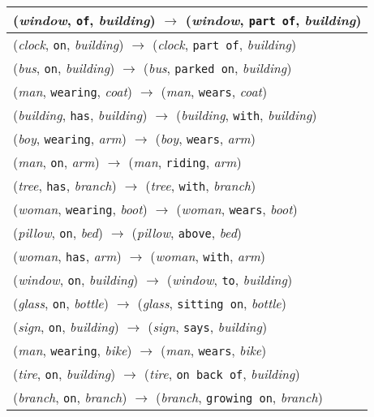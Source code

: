 \documentclass[runningheads]{llncs}
\begin{document}
{\begin{longtable}{ l }
(\textit{window}, \texttt{of}, \textit{building}) $\rightarrow$ (\textit{window}, \texttt{part of}, \textit{building}) \\ \hline
(\textit{clock}, \texttt{on}, \textit{building}) $\rightarrow$ (\textit{clock}, \texttt{part of}, \textit{building}) \\ \hline
(\textit{bus}, \texttt{on}, \textit{building}) $\rightarrow$ (\textit{bus}, \texttt{parked on}, \textit{building}) \\ \hline
(\textit{man}, \texttt{wearing}, \textit{coat}) $\rightarrow$ (\textit{man}, \texttt{wears}, \textit{coat}) \\ \hline
(\textit{building}, \texttt{has}, \textit{building}) $\rightarrow$ (\textit{building}, \texttt{with}, \textit{building}) \\ \hline
(\textit{boy}, \texttt{wearing}, \textit{arm}) $\rightarrow$ (\textit{boy}, \texttt{wears}, \textit{arm}) \\ \hline
(\textit{man}, \texttt{on}, \textit{arm}) $\rightarrow$ (\textit{man}, \texttt{riding}, \textit{arm}) \\ \hline
(\textit{tree}, \texttt{has}, \textit{branch}) $\rightarrow$ (\textit{tree}, \texttt{with}, \textit{branch}) \\ \hline
(\textit{woman}, \texttt{wearing}, \textit{boot}) $\rightarrow$ (\textit{woman}, \texttt{wears}, \textit{boot}) \\ \hline
(\textit{pillow}, \texttt{on}, \textit{bed}) $\rightarrow$ (\textit{pillow}, \texttt{above}, \textit{bed}) \\ \hline
(\textit{woman}, \texttt{has}, \textit{arm}) $\rightarrow$ (\textit{woman}, \texttt{with}, \textit{arm}) \\ \hline
(\textit{window}, \texttt{on}, \textit{building}) $\rightarrow$ (\textit{window}, \texttt{to}, \textit{building}) \\ \hline
(\textit{glass}, \texttt{on}, \textit{bottle}) $\rightarrow$ (\textit{glass}, \texttt{sitting on}, \textit{bottle}) \\ \hline
(\textit{sign}, \texttt{on}, \textit{building}) $\rightarrow$ (\textit{sign}, \texttt{says}, \textit{building}) \\ \hline
(\textit{man}, \texttt{wearing}, \textit{bike}) $\rightarrow$ (\textit{man}, \texttt{wears}, \textit{bike}) \\ \hline
(\textit{tire}, \texttt{on}, \textit{building}) $\rightarrow$ (\textit{tire}, \texttt{on back of}, \textit{building}) \\ \hline
(\textit{branch}, \texttt{on}, \textit{branch}) $\rightarrow$ (\textit{branch}, \texttt{growing on}, \textit{branch}) \\ \hline

\end{longtable}}
\end{document}
